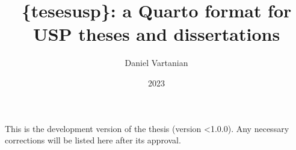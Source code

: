 \documentclass[
  12pt,
  a4paper,
  oneside]{tesesusp}
\title{\{tesesusp\}: a Quarto format for USP theses and dissertations}
\author{Daniel Vartanian}
\date{2023}
\begin{document}
\maketitle


\frenchspacing



\clearpage


\imprimircapa



\imprimirfolhaderosto*


\begin{fichacatalografica}
 
\end{fichacatalografica}


\begin{errata}
  \noindent
  This is the development version of the thesis (version <1.0.0). Any necessary corrections will be listed here after its approval.
\end{errata}

\end{document}
